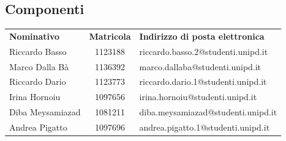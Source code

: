 \subsection{Componenti}
\begin{table}[H]
	\centering\renewcommand{\arraystretch}{1.5}
	
	\begin{tabular}{l c l}
		
		
		\rowcolorhead 
		{ \textbf{Nominativo}} &
		{ \textbf{Matricola}} &
		{ \textbf{Indirizzo di posta elettronica}}  \\
		
		\rowcolorlight
		Riccardo Basso & 1123188 & riccardo.basso.2@studenti.unipd.it  \\ 
		\rowcolordark
		Marco Dalla Bà & 1136392 & marco.dallaba@studenti.unipd.it  \\ 
		\rowcolorlight
		Riccardo Dario & 1123773 & riccardo.dario.1@studenti.unipd.it  \\ 
		\rowcolordark
		Irina Hornoiu & 1097656 &  irina.hornoiu@studenti.unipd.it \\ 
		\rowcolorlight
		Diba Meysamiazad & 1081211 & diba.meysamiazad@studenti.unipd.it  \\ 
		\rowcolordark
		Andrea Pigatto & 1097696  & andrea.pigatto.1@studenti.unipd.it  \\ 
	\end{tabular}
\end{table}

